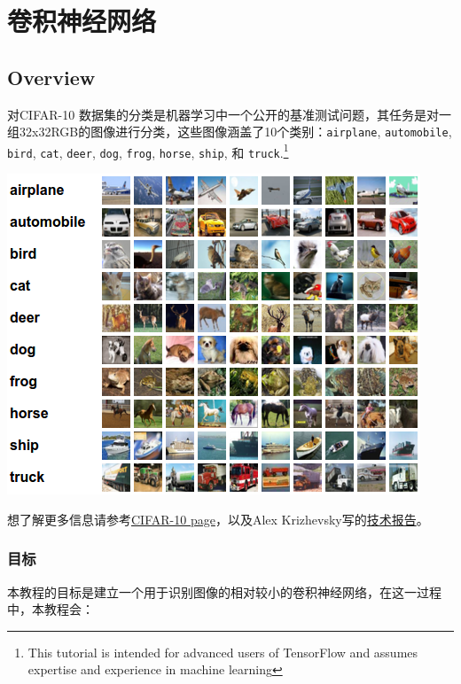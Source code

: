 



\newpage
\section {卷积神经网络} \label{cnn}

\subsection {Overview}


对CIFAR-10 数据集的分类是机器学习中一个公开的基准测试问题，其任务是对一组32x32RGB的图像进行分类，这些图像涵盖了10个类别：\lstinline{airplane}, \lstinline{automobile}, \lstinline{bird}, \lstinline{cat}, \lstinline{deer}, \lstinline{dog}, \lstinline{frog}, \lstinline{horse}, \lstinline{ship}, 和 \lstinline{truck}.\footnote{This tutorial is intended for advanced users of TensorFlow and assumes expertise and experience in machine learning}

\begin{center}
\includegraphics[width=.7\textwidth]{../SOURCE/images/cifar_samples.png}
\end{center}

想了解更多信息请参考\href{http://www.cs.toronto.edu/~kriz/cifar.html}{CIFAR-10 page}，以及Alex Krizhevsky写的\href{http://www.cs.toronto.edu/~kriz/learning-features-2009-TR.pdf}{技术报告}。

\subsubsection {目标}
本教程的目标是建立一个用于识别图像的相对较小的卷积神经网络，在这一过程中，本教程会：


